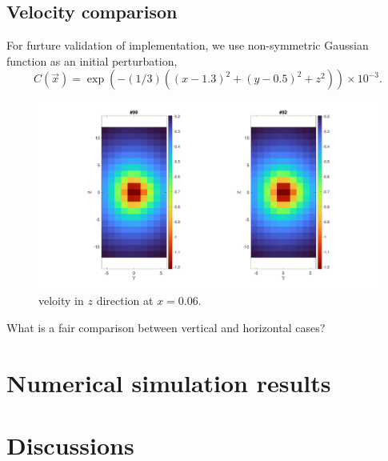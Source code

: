 \subsection{Velocity comparison}
For furture validation of implementation, 
we use non-symmetric Gaussian function as an initial perturbation,
\[
C(\vec{x}) = 
\exp{(-(1/3)((x-1.3)^2 + (y-0.5)^2 + z^2))} \times 10^{-3}.	
\]
\begin{figure}[h]
	\begin{center}
		\includegraphics[scale=0.35]{./figures/fig_velZ_99_92R_xp06}
	\caption{veloity in $z$ direction at $x = 0.06$.}
	\label{fig_velZ_99_92R_xp06}
\end{center}
\end{figure}
What is a fair comparison between vertical and horizontal cases?
\section{Numerical simulation results}
\section{Discussions}